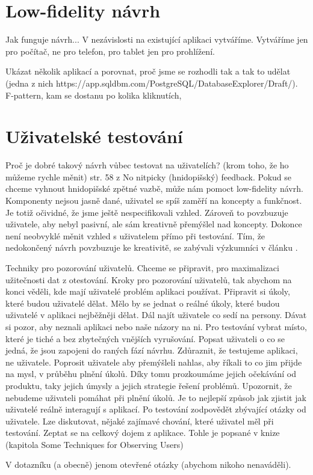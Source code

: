 \section{Low-fidelity návrh}

Jak funguje návrh... V nezávislosti na existující aplikaci vytváříme.
Vytváříme jen pro počítač, ne pro telefon, pro tablet jen pro prohlížení.

Ukázat několik aplikací a porovnat, proč jsme se rozhodli tak a tak to udělat (jedna z nich https://app.sqldbm.com/PostgreSQL/DatabaseExplorer/Draft/). F-pattern, kam se dostanu po kolika kliknutích, 

\section{Uživatelské testování}


Proč je dobré takový návrh vůbec testovat na uživatelích? (krom toho, že ho můžeme rychle měnit) str. 58 z \cite{Paper_Prototyping} No nitpicky (hnidopišský) feedback. Pokud se chceme vyhnout hnidopišské zpětné vazbě, může nám pomoct low-fidelity návrh. Komponenty nejsou jasně dané, uživatel se spíš zaměří na koncepty a funkčnost. Je totiž očividné, že jsme ještě nespecifikovali vzhled. Zároveň to povzbuzuje uživatele, aby nebyl pasivní, ale sám kreativně přemýšlel nad koncepty. Dokonce není neobvyklé měnit vzhled s uživatelem přímo při testování. Tím, že nedokončený návrh povzbuzuje ke kreativitě, se zabývali výzkumníci v článku \cite{Schumann_1996_AEN}.

Techniky pro pozorování uživatelů. Chceme se připravit, pro maximalizaci užitečnosti dat z otestování. Kroky pro pozorování uživatelů, tak abychom na konci věděli, kde mají uživatelé problém aplikaci používat. 
Připravit si úkoly, které budou uživatelé dělat. Mělo by se jednat o reálné úkoly, které budou uživatelé v aplikaci nejběžněji dělat. 
Dál najít uživatele co sedí na persony. Dávat si pozor, aby neznali aplikaci nebo naše názory na ni.
Pro testování vybrat místo, které je tiché a bez zbytečných vnějších vyrušování.
Popsat uživateli o co se jedná, že jsou zapojeni do raných fází návrhu. Zdůraznit, že testujeme aplikaci, ne uživatele.
Poprosit uživatele aby přemýšleli nahlas, aby říkali to co jim přijde na mysl, v průběhu plnění úkolů. Díky tomu prozkoumáme jejich očekávání od produktu, taky jejich úmysly a jejich strategie řešení problémů.
Upozornit, že nebudeme uživateli pomáhat při plnění úkolů. Je to nejlepší způsob jak zjistit jak uživatelé reálně interagují s aplikací. 
Po testování zodpovědět zbývající otázky od uživatele. Lze diskutovat, nějaké zajímavé chování, které uživatel měl při testování. Zeptat se na celkový dojem z aplikace. Tohle je popsané v knize \cite{Brenda_1990_art} (kapitola Some Techniques for Observing Users)

V dotazníku (a obecně) jenom otevřené otázky (abychom nikoho nenaváděli).


